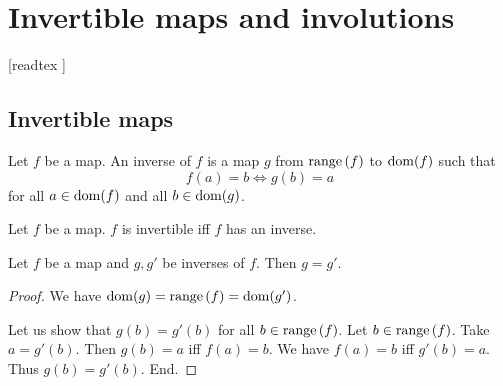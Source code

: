 \documentclass[../../set-theory/set-theory.tex]{subfiles}
\begin{document}
  \chapter{Invertible maps and involutions}\label{chapter:invertible-maps}


  \begin{forthel}

    [readtex ]

  \end{forthel}


  \section{Invertible maps}

  \begin{forthel}
    \begin{definition}
      Let $f$ be a map.
      An inverse of $f$ is a map $g$ from $\mathrm{range}\left(f\right)$ to $\operatorname{dom}(f)$ such that
      \[ f(a) = b \iff g(b) = a \]
      for all $a \in \operatorname{dom}(f)$ and all $b \in \operatorname{dom}(g)$.
    \end{definition}
  \end{forthel}

  \begin{forthel}
    \begin{definition}
      Let $f$ be a map.
      $f$ is invertible iff $f$ has an inverse.
    \end{definition}
  \end{forthel}

  \begin{forthel}
    \begin{lemma}
      Let $f$ be a map and $g, g'$ be inverses of $f$.
      Then $g = g'$.
    \end{lemma}
    \begin{proof}
      We have $\operatorname{dom}(g) = \mathrm{range}\left(f\right) = \operatorname{dom}(g')$.

      Let us show that $g(b) = g'(b)$ for all $b \in \mathrm{range}\left(f\right)$.
        Let $b \in \mathrm{range}\left(f\right)$.
        Take $a = g'(b)$.
        Then $g(b) = a$ iff $f(a) = b$.
        We have $f(a) = b$ iff $g'(b) = a$.
        Thus $g(b) = g'(b)$.
      End.
    \end{proof}
  \end{forthel}
\end{document}
